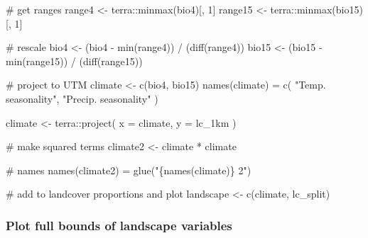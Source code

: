 \documentclass[
]{article}
\newenvironment{Shaded}{}{}
\newcommand{\CommentTok}[1]{\textcolor[rgb]{0.00,0.50,0.00}{#1}}
\newcommand{\DataTypeTok}[1]{#1}
\newcommand{\DecValTok}[1]{#1}
\newcommand{\KeywordTok}[1]{\textcolor[rgb]{0.00,0.00,1.00}{#1}}
\newcommand{\NormalTok}[1]{#1}
\newcommand{\OperatorTok}[1]{#1}
\newcommand{\StringTok}[1]{\textcolor[rgb]{0.00,0.50,0.50}{#1}}
\begin{document}
\begin{Shaded}
\begin{Highlighting}[]
\CommentTok{# get ranges}
\NormalTok{range4 <-}\StringTok{ }\NormalTok{terra}\OperatorTok{::}\KeywordTok{minmax}\NormalTok{(bio4)[, }\DecValTok{1}\NormalTok{] }
\NormalTok{range15 <-}\StringTok{ }\NormalTok{terra}\OperatorTok{::}\KeywordTok{minmax}\NormalTok{(bio15)[, }\DecValTok{1}\NormalTok{]}

\CommentTok{# rescale}
\NormalTok{bio4 <-}\StringTok{ }\NormalTok{(bio4 }\OperatorTok{-}\StringTok{ }\KeywordTok{min}\NormalTok{(range4)) }\OperatorTok{/}\StringTok{ }\NormalTok{(}\KeywordTok{diff}\NormalTok{(range4))}
\NormalTok{bio15 <-}\StringTok{ }\NormalTok{(bio15 }\OperatorTok{-}\StringTok{ }\KeywordTok{min}\NormalTok{(range15)) }\OperatorTok{/}\StringTok{ }\NormalTok{(}\KeywordTok{diff}\NormalTok{(range15))}

\CommentTok{# project to UTM}
\NormalTok{climate <-}\StringTok{ }\KeywordTok{c}\NormalTok{(bio4, bio15)}
\KeywordTok{names}\NormalTok{(climate) =}\StringTok{ }\KeywordTok{c}\NormalTok{(}
  \StringTok{"Temp. seasonality"}\NormalTok{, }
  \StringTok{"Precip. seasonality"}
\NormalTok{)}

\NormalTok{climate <-}\StringTok{ }\NormalTok{terra}\OperatorTok{::}\KeywordTok{project}\NormalTok{(}
  \DataTypeTok{x =}\NormalTok{ climate, }\DataTypeTok{y =}\NormalTok{ lc_1km}
\NormalTok{)}

\CommentTok{# make squared terms}
\NormalTok{climate2 <-}\StringTok{ }\NormalTok{climate }\OperatorTok{*}\StringTok{ }\NormalTok{climate}

\CommentTok{# names}
\KeywordTok{names}\NormalTok{(climate2) =}\StringTok{ }\KeywordTok{glue}\NormalTok{(}\StringTok{"\{names(climate)\} 2"}\NormalTok{)}

\CommentTok{# add to landcover proportions and plot}
\NormalTok{landscape <-}\StringTok{ }\KeywordTok{c}\NormalTok{(climate, lc_split)}
\end{Highlighting}
\end{Shaded}

\hypertarget{plot-full-bounds-of-landscape-variables}{%
\subsubsection{Plot full bounds of landscape variables}\label{plot-full-bounds-of-landscape-variables}}
\end{document}
